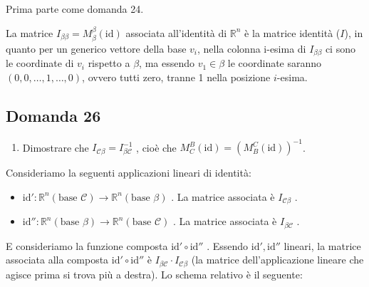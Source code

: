 \documentclass[
  a4paper,
]{article}
\providecommand{\tightlist}{%
  \setlength{\itemsep}{0pt}\setlength{\parskip}{0pt}}
\providecommand{\tightlist}{}
\begin{document}
Prima parte come domanda 24.

La matrice \(I_{\beta \beta} = M_{\beta}^{\beta}(\text{id})\) associata
all'identità di \(\mathbb{R}^n\) è la matrice identità (\(I\)), in
quanto per un generico vettore della base \(v_i\), nella colonna i-esima
di \(I_{\beta \beta}\) ci sono le coordinate di \(v_i\) rispetto a
\(\beta\), ma essendo \(v_1 \in \beta\) le coordinate saranno
\((0, 0, \dots , 1, \dots, 0)\), ovvero tutti zero, tranne 1 nella
posizione \(i\)-esima.

\hypertarget{domanda-26}{%
\subsection{Domanda 26}\label{domanda-26}}

\begin{observationbox}[Domanda]
\begin{enumerate}
\def\labelenumi{\arabic{enumi}.}
\setcounter{enumi}{25}
\tightlist
\item
  Dimostrare che \(I_{\mathcal{C} \beta} = I_{\beta \mathcal{C}}^{-1}\)
  , cioè che \(M^B_C(\text{id})=(M^C_B(\text{id}))^{-1}\).
\end{enumerate}
\end{observationbox}

Consideriamo la seguenti applicazioni lineari di identità:

\begin{itemize}
\tightlist
\item
  \(\text{id}' : \mathbb{R}^n (\text{base } \mathcal{C}) \to \mathbb{R}^n (\text{base } \beta)\)
  . La matrice associata è \(I_{\mathcal{C} \beta}\) .
\item
  \(\text{id}'' : \mathbb{R}^n (\text{base } \beta) \to \mathbb{R}^n (\text{base } \mathcal{C})\)
  . La matrice associata è \(I_{\beta \mathcal{C}}\) .
\end{itemize}

E consideriamo la funzione composta \(\text{id}' \circ \text{id}''\) .
Essendo \(\text{id}' ,\text{id}''\) lineari, la matrice associata alla
composta \(\text{id}' \circ \text{id}''\) è
\(I_{\beta \mathcal{C}} \cdot I_{\mathcal{C} \beta}\) (la matrice
dell'applicazione lineare che agisce prima si trova più a destra). Lo
schema relativo è il seguente:

\begin{center}
\end{center}
\end{document}
